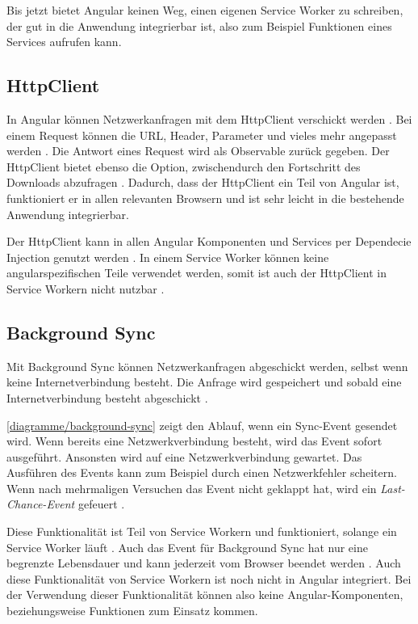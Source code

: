 Bis jetzt bietet Angular keinen Weg, einen eigenen Service Worker zu schreiben, der gut in die Anwendung integrierbar ist, also zum Beispiel Funktionen eines Services aufrufen kann. 

\subsection{HttpClient}
In Angular können Netzwerkanfragen mit dem HttpClient verschickt werden \autocite{httpClient}. Bei einem Request können die URL, Header, Parameter und vieles mehr angepasst werden \autocite{httpClient}. Die Antwort eines Request wird als Observable zurück gegeben. Der HttpClient bietet ebenso die Option, zwischendurch den Fortschritt des Downloads abzufragen \autocite{httpClient}. Dadurch, dass der HttpClient ein Teil von Angular ist, funktioniert er in allen relevanten Browsern und ist sehr leicht in die bestehende Anwendung integrierbar. 

Der HttpClient kann in allen Angular Komponenten und Services per Dependecie Injection genutzt werden \autocite{httpClient}. In einem Service Worker können keine angularspezifischen Teile verwendet werden, somit ist auch der HttpClient in Service Workern nicht nutzbar \autocite{service-worker-angular}.

\subsection{Background Sync}

Mit Background Sync können Netzwerkanfragen abgeschickt werden, selbst wenn keine Internetverbindung besteht. Die Anfrage wird gespeichert und sobald eine Internetverbindung besteht abgeschickt \autocite{wicg-background-sync} \autocite{Rojas2020}. 

\autoref{diagramme/background-sync} zeigt den Ablauf, wenn ein Sync-Event gesendet wird. Wenn bereits eine Netzwerkverbindung besteht, wird das Event sofort ausgeführt. Ansonsten wird auf eine Netzwerkverbindung gewartet. Das Ausführen des Events kann zum Beispiel durch einen Netzwerkfehler scheitern. Wenn nach mehrmaligen Versuchen das Event nicht geklappt hat, wird ein \textit{Last-Chance-Event} gefeuert \autocite{Rojas2020}.

Diese Funktionalität ist Teil von Service Workern und funktioniert, solange ein Service Worker läuft \autocite{wicg-background-sync}. Auch das Event für Background Sync hat nur eine begrenzte Lebensdauer und kann jederzeit vom Browser beendet werden \autocite{service-worker-spec}. Auch diese Funktionalität von Service Workern ist noch nicht in Angular integriert. Bei der Verwendung dieser Funktionalität können also keine Angular-Komponenten, beziehungsweise Funktionen zum Einsatz kommen.

